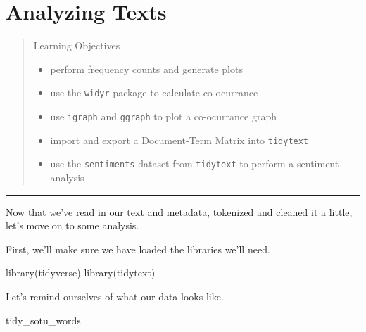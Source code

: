 \documentclass[
]{book}
\newenvironment{Shaded}{\begin{snugshade}}{\end{snugshade}}
\newcommand{\FunctionTok}[1]{\textcolor[rgb]{0.00,0.00,0.00}{#1}}
\newcommand{\NormalTok}[1]{#1}
\providecommand{\tightlist}{%
  \setlength{\itemsep}{0pt}\setlength{\parskip}{0pt}}
\begin{document}
\hypertarget{textanalysis}{%
\chapter{Analyzing Texts}\label{textanalysis}}

\begin{quote}
Learning Objectives

\begin{itemize}
\tightlist
\item
  perform frequency counts and generate plots
\item
  use the \texttt{widyr} package to calculate co-ocurrance
\item
  use \texttt{igraph} and \texttt{ggraph} to plot a co-ocurrance graph
\item
  import and export a Document-Term Matrix into \texttt{tidytext}
\item
  use the \texttt{sentiments} dataset from \texttt{tidytext} to perform a sentiment analysis
\end{itemize}
\end{quote}

\begin{center}\rule{0.5\linewidth}{0.5pt}\end{center}

Now that we've read in our text and metadata, tokenized and cleaned it a little, let's move on to some analysis.

First, we'll make sure we have loaded the libraries we'll need.

\begin{Shaded}
\begin{Highlighting}[]
\FunctionTok{library}\NormalTok{(tidyverse)}
\FunctionTok{library}\NormalTok{(tidytext)}
\end{Highlighting}
\end{Shaded}

Let's remind ourselves of what our data looks like.

\begin{Shaded}
\begin{Highlighting}[]
\NormalTok{tidy\_sotu\_words}
\end{Highlighting}
\end{Shaded}
\end{document}
